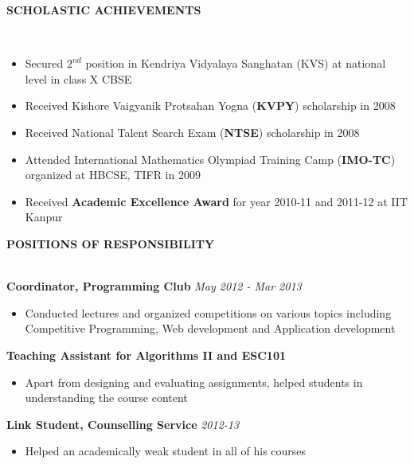 \documentclass[10pt]{article}
\newcommand{\cvsectiontitle}[1]{
    		\colorbox{gray!40}{%
        \begin{minipage}{0.989\linewidth}%
            \vspace*{1pt}%
            \large\indent\textbf{#1}
            \vspace*{1pt}%
        \end{minipage}%
   		}\\[1mm]
		}
\begin{document}
\cvsectiontitle{SCHOLASTIC ACHIEVEMENTS}
\vspace{-0.5cm}
\begin{itemize}[leftmargin=0.5cm]
\setlength{\itemsep}{0.1mm}
\item Secured $2^{nd}$ position in Kendriya Vidyalaya Sanghatan (KVS) at national level in class X CBSE
\item Received Kishore Vaigyanik Protsahan Yogna (\textbf{KVPY}) scholarship in 2008
\item Received National Talent Search Exam (\textbf{NTSE}) scholarship in 2008
\item Attended International Mathematics Olympiad Training Camp (\textbf{IMO-TC}) organized at HBCSE, TIFR in 2009
\item Received \textbf{Academic Excellence Award} for year 2010-11 and 2011-12 at IIT Kanpur
\end{itemize}

\cvsectiontitle{POSITIONS OF RESPONSIBILITY}
\textbf{Coordinator, Programming Club} \hfill \textit{May 2012 - Mar 2013}
\vspace{-0.2cm}
\begin{itemize}
\item Conducted lectures and organized competitions on various topics including Competitive Programming, Web development and Application development
\end{itemize}
\textbf{Teaching Assistant for Algorithms II and ESC101}
\vspace{-0.2cm}
\begin{itemize}
\item Apart from designing and evaluating assignments, helped students in understanding the course content
\end{itemize}
\textbf{Link Student, Counselling Service} \hfill \textit{2012-13}
\vspace{-0.2cm}
\begin{itemize}
\item Helped an academically weak student in all of his courses
\end{itemize}
\end{document}
